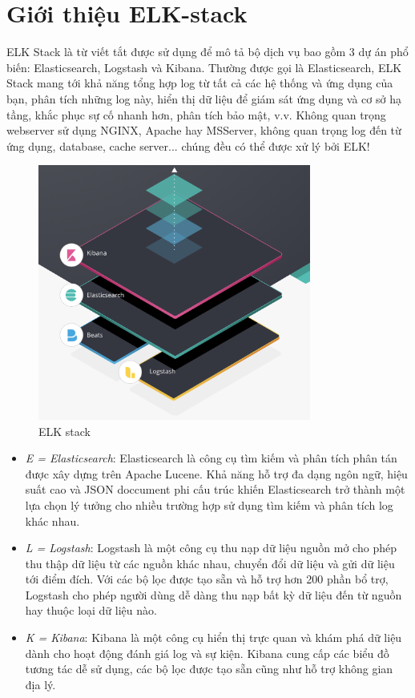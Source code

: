\section{Giới thiệu ELK-stack}
ELK Stack là từ viết tắt được sử dụng để mô tả bộ dịch vụ bao gồm 3 dự án phổ biến: Elasticsearch, Logstash và Kibana. Thường được gọi là Elasticsearch, ELK Stack mang tới khả năng tổng hợp log từ tất cả các hệ thống và ứng dụng của bạn, phân tích những log này, hiển thị dữ liệu để giám sát ứng dụng và cơ sở hạ tầng, khắc phục sự cố nhanh hơn, phân tích bảo mật, v.v. Không quan trọng webserver sử dụng NGINX, Apache hay MSServer, không quan trọng log đến từ ứng dụng, database, cache server... chúng đều có thể được xử lý bởi ELK!

\begin{figure}[H] %
    \centering %
    \includegraphics[width=0.8\textwidth]{figures/elk_02.png} 
    \caption{ELK stack} %
    \label{fig:elk_02}
\end{figure}

\begin{itemize}
    \item \textit{E = Elasticsearch}: Elasticsearch là công cụ tìm kiếm và phân tích phân tán được xây dựng trên Apache Lucene. Khả năng hỗ trợ đa dạng ngôn ngữ, hiệu suất cao và JSON doccument phi cấu trúc khiến Elasticsearch trở thành một lựa chọn lý tưởng cho nhiều trường hợp sử dụng tìm kiếm và phân tích log khác nhau.
    \item \textit{L = Logstash}: Logstash là một công cụ thu nạp dữ liệu nguồn mở cho phép thu thập dữ liệu từ các nguồn khác nhau, chuyển đổi dữ liệu và gửi dữ liệu tới điểm đích. Với các bộ lọc được tạo sẵn và hỗ trợ hơn 200 phần bổ trợ, Logstash cho phép người dùng dễ dàng thu nạp bất kỳ dữ liệu đến từ nguồn hay thuộc loại dữ liệu nào.
    \item \textit{K = Kibana}: Kibana là một công cụ hiển thị trực quan và khám phá dữ liệu dành cho hoạt động đánh giá log và sự kiện. Kibana cung cấp các biểu đồ tương tác dễ sử dụng, các bộ lọc được tạo sẵn cũng như hỗ trợ không gian địa lý. 
\end{itemize}

